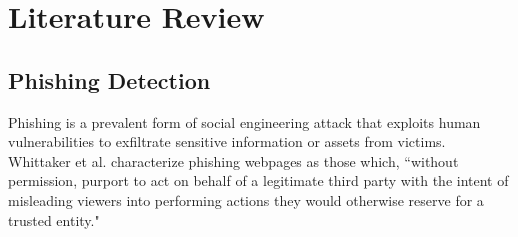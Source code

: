 \section{Literature Review}

\subsection{Phishing Detection}

Phishing is a prevalent form of social engineering attack that exploits human vulnerabilities to exfiltrate sensitive information or assets from victims. Whittaker et al.\cite{whittaker2010large} characterize phishing webpages as those which, ``without permission, purport to act on behalf of a legitimate third party with the intent of misleading viewers into performing actions they would otherwise reserve for a trusted entity."

